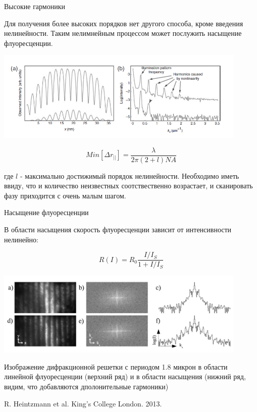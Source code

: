 \documentclass[9pt, compress, xcolor=table]{beamer}
\begin{document}
\begin{frame}{Высокие гармоники}

Для получения более высоких порядков нет другого способа, кроме введения нелинейности. Таким нелимнейным процессом может послужить насыщение флуоресценции.
\begin{center}
\includegraphics[width=0.9\textwidth]{ffm18}
\end{center}

\begin{equation*}
\boxed{Min[\Delta r_{||}]=\frac{\lambda}{2\pi (2+l)NA}}
\end{equation*}

где $l$ - максимально достижимый порядок нелинейности. Необходимо иметь ввиду, что и количество неизвестных соотствественно возрастает, и сканировать фазу приходится с очень малым шагом.
\end{frame}

\begin{frame}{Насыщение флуоресценции}

В области насыщения скорость флуоресценции зависит от интенсивности нелинейно:

\begin{equation*}
R(I)=R_0\frac{I/I_S}{1+I/I_S}
\end{equation*}

\begin{center}
\includegraphics[width=0.9\textwidth]{nlsim13}
\end{center}

Изображение дифракционной решетки с периодом 1.8 микрон в области линейной флуоресценции (верхний ряд) и в области насыщения (нижний ряд, видим, что добавляются дполонительные гармоники)

R. Heintzmann et al. King's College London. 2013.


\end{frame}
\end{document}
